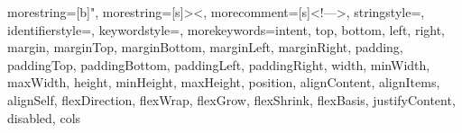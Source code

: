 \usepackage{listings}

\usepackage{color}


{
  morestring=[b]",
  morestring=[s]{>}{<},
  morecomment=[s]{<!--}{-->},
  stringstyle=\color{string},
  identifierstyle=\color{darkblue},
  keywordstyle=\color{cyan},
  morekeywords={intent, top, bottom, left, right, margin, marginTop, marginBottom, marginLeft, marginRight, padding, paddingTop, paddingBottom, paddingLeft, paddingRight, width, minWidth, maxWidth, height, minHeight, maxHeight, position, alignContent, alignItems, alignSelf, flexDirection, flexWrap, flexGrow, flexShrink, flexBasis, justifyContent, disabled, cols}
}